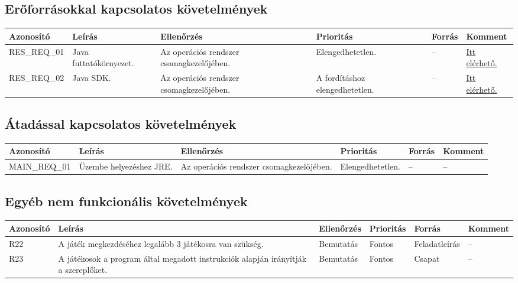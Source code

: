 \subsection{Erőforrásokkal kapcsolatos követelmények}


\begin{longtable}{| l | l | p{3cm} | p{3cm} | l | l |}
\hline
\textbf{Azonosító}   & \textbf{Leírás} & \textbf{Ellenőrzés} & \textbf{Prioritás} & \textbf{Forrás} & \textbf{Komment} \tabularnewline
\hline\hline
RES\_REQ\_01 & Java futtatókörnyezet. & Az operációs rendszer csomagkezelőjében. & Elengedhetetlen. & -- & \href{https://www.java.com/en/download/}{Itt elérhető.} \tabularnewline
\hline
RES\_REQ\_02 & Java SDK. & Az operációs rendszer csomagkezelőjében. & A fordításhoz elengedhetetlen. & -- & \href{https://www.oracle.com/java/technologies/javase/javase-jdk8-downloads.html}{Itt elérhető.} \tabularnewline
\hline
\end{longtable}


\subsection{Átadással kapcsolatos követelmények}

\begin{longtable}{| l | l | p{3cm} | l | l | l |}
\hline
\textbf{Azonosító}   & \textbf{Leírás} & \textbf{Ellenőrzés} & \textbf{Prioritás} & \textbf{Forrás} & \textbf{Komment} \tabularnewline
\hline\hline
MAIN\_REQ\_01 & Üzembe helyezéshez JRE. & Az operációs rendszer csomagkezelőjében. & Elengedhetetlen. & -- & -- \tabularnewline
\hline
\end{longtable}

\subsection{Egyéb nem funkcionális követelmények}

\begin{longtable}{| l | p{3cm} | l | l | l | l |}
\hline
\textbf{Azonosító}   & \textbf{Leírás} & \textbf{Ellenőrzés} & \textbf{Prioritás} & \textbf{Forrás} & \textbf{Komment} \tabularnewline
\hline\hline
R22 & A játék megkezdéséhez legalább 3 játékosra van szükség. & Bemutatás & Fontos & Feladatleírás & -- \tabularnewline
\hline
R23 & A játékosok a program által megadott instrukciók alapján irányítják a szereplőket. & Bemutatás & Fontos & Csapat & -- \tabularnewline
\hline
\end{longtable}


